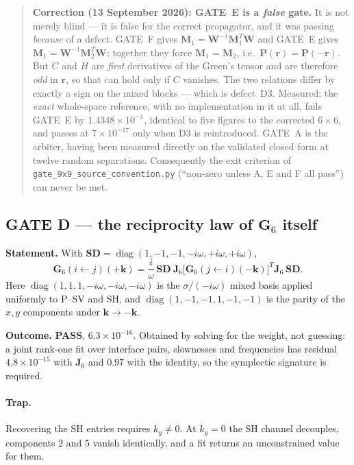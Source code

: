 \documentclass[11pt,a4paper]{article}
\newcommand{\bJ}{\mathbf{J}}
\newcommand{\bW}{\mathbf{W}}
\newcommand{\bG}{\mathbf{G}}
\newcommand{\bM}{\mathbf{M}}
\newcommand{\bS}{\mathbf{S}}
\newcommand{\bD}{\mathbf{D}}
\newcommand{\bP}{\mathbf{P}}
\begin{document}
\begin{quote}\small
\textbf{Correction (13 September 2026): GATE~E is a \emph{false} gate.}  It is
not merely blind --- it is false for the correct propagator, and it was passing
\emph{because} of a defect.  GATE~F gives $\bM_1 = \bW^{-1}\bM_1^{T}\bW$ and
GATE~E gives $\bM_1 = \bW^{-1}\bM_2^{T}\bW$; together they force
$\bM_1 = \bM_2$, i.e.\ $\bP(\mathbf{r}) = \bP(-\mathbf{r})$.  But $C$ and $H$
are \emph{first} derivatives of the Green's tensor and are therefore \emph{odd}
in $\mathbf{r}$, so that can hold only if $C$ vanishes.  The two relations
differ by exactly a sign on the mixed blocks --- which is defect~D3.  Measured:
the \emph{exact} whole-space reference, with no implementation in it at all,
fails GATE~E by $1.4348\times10^{-1}$, identical to five figures to the
corrected $6\times6$, and passes at $7\times10^{-17}$ only when D3 is
reintroduced.  GATE~A is the arbiter, having been measured directly on the
validated closed form at twelve random separations.  Consequently the exit
criterion of \texttt{gate\_9x9\_source\_convention.py} (``non-zero unless A, E
and F all pass'') can never be met.
\end{quote}

\subsection{GATE D --- the reciprocity law of $\bG_6$ itself}

\textbf{Statement.}  With
$\bS\bD = \operatorname{diag}(1,-1,-1,-i\omega,+i\omega,+i\omega)$,
\begin{equation}\label{eq:gateD}
  \bG_6(i\!\leftarrow\! j)(+\mathbf{k})
  = \frac{i}{\omega}\,\bS\bD\ \bJ_6\bigl[\bG_6(j\!\leftarrow\! i)(-\mathbf{k})\bigr]^{T}\bJ_6\ \bS\bD .
\end{equation}
Here $\operatorname{diag}(1,1,1,-i\omega,-i\omega,-i\omega)$ is the
$\sigma/(-i\omega)$ mixed basis applied uniformly to P--SV and SH, and
$\operatorname{diag}(1,-1,-1,1,-1,-1)$ is the parity of the $x,y$ components
under $\mathbf{k}\to-\mathbf{k}$.

\textbf{Outcome.}  \textbf{PASS}, $6.3\times10^{-16}$.  Obtained by solving for
the weight, not guessing: a joint rank-one fit over interface pairs,
slownesses and frequencies has residual $4.8\times10^{-15}$ with $\bJ_6$ and
$0.97$ with the identity, so the symplectic signature is required.

\paragraph{Trap.}  Recovering the SH entries requires $k_y\neq0$.  At $k_y=0$
the SH channel decouples, components $2$ and $5$ vanish identically, and a fit
returns an unconstrained value for them.
\end{document}
